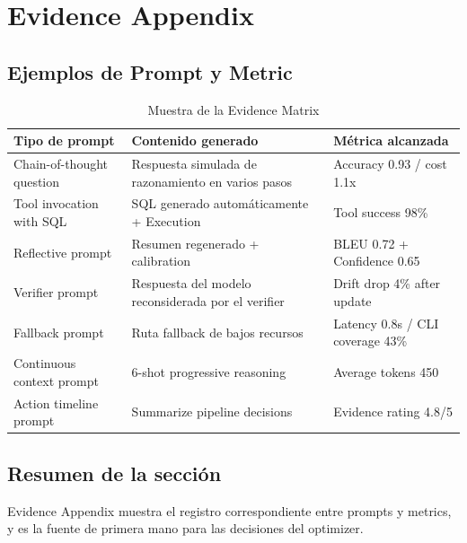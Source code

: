 \section{Evidence Appendix}

\subsection{Ejemplos de Prompt y Metric}

\begin{table}[H]
\centering
\caption{Muestra de la Evidence Matrix}
\begin{tabular}{p{}p{}p{}}
\toprule
Tipo de prompt & Contenido generado & Métrica alcanzada \\
\midrule
Chain-of-thought question & Respuesta simulada de razonamiento en varios pasos & Accuracy 0.93 / cost 1.1x \\
Tool invocation with SQL & SQL generado automáticamente + Execution & Tool success 98\% \\
Reflective prompt & Resumen regenerado + calibration & BLEU 0.72 + Confidence 0.65 \\
Verifier prompt & Respuesta del modelo reconsiderada por el verifier & Drift drop 4\% after update \\
Fallback prompt & Ruta fallback de bajos recursos & Latency 0.8s / CLI coverage 43\% \\
Continuous context prompt & 6-shot progressive reasoning & Average tokens 450 \\
Action timeline prompt & Summarize pipeline decisions & Evidence rating 4.8/5 \\
\bottomrule
\end{tabular}
\end{table}

\subsection{Resumen de la sección}

Evidence Appendix muestra el registro correspondiente entre prompts y metrics, y es la fuente de primera mano para las decisiones del optimizer.
